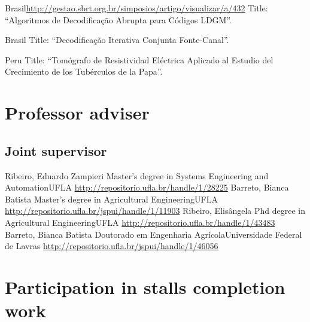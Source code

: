 \documentclass[11pt,a4paper,sans]{moderncv} %
\begin{document}
	      {Brasil}{}{\url{http://gestao.sbrt.org.br/simposios/artigo/visualizar/a/432}}
	      {Title: ``Algoritmos de Decodificação Abrupta para Códigos LDGM''.}

	      {Brasil}{}{}%
	      {Title: ``Decodificação Iterativa Conjunta Fonte-Canal''.}

	      {Peru}{}{}
	      {Title: ``Tomógrafo de Resistividad Eléctrica Aplicado al Estudio del Crecimiento de los Tubérculos de la Papa''.}


	       
\section{Professor adviser}
\subsection{Joint supervisor}
			{Ribeiro, Eduardo Zampieri}
			{Master's degree in Systems Engineering and Automation}{UFLA}
			{\url{http://repositorio.ufla.br/handle/1/28225}}
			{Barreto, Bianca Batista}
			{Master's degree in Agricultural Engineering}{UFLA}
			{\url{http://repositorio.ufla.br/jspui/handle/1/11903}}
			{Ribeiro, Elisângela }
			{Phd degree in Agricultural Engineering}{UFLA}
			{\url{http://repositorio.ufla.br/handle/1/43483}}
			{Barreto, Bianca Batista}
			{Doutorado em Engenharia Agrícola}{Universidade Federal de Lavras}
			{\url{http://repositorio.ufla.br/jspui/handle/1/46056}}

\section{Participation in stalls completion work}
\end{document}
